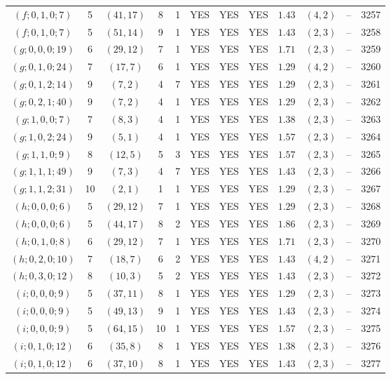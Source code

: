 \begin{longtable}{|c|c|c|c|c|c|c|c|c|c|c|c|}
$(f;0,1,0;7)$ & 5 & $(41,17)$ & 8 & 1 & YES & YES & YES & $1.43$ & $(4,2)$ & -- & 3257\\
$(f;0,1,0;7)$ & 5 & $(51,14)$ & 9 & 1 & YES & YES & YES & $1.43$ & $(2,3)$ & -- & 3258\\
$(g;0,0,0;19)$ & 6 & $(29,12)$ & 7 & 1 & YES & YES & YES & $1.71$ & $(2,3)$ & -- & 3259\\
$(g;0,1,0;24)$ & 7 & $(17,7)$ & 6 & 1 & YES & YES & YES & $1.29$ & $(4,2)$ & -- & 3260\\
$(g;0,1,2;14)$ & 9 & $(7,2)$ & 4 & 7 & YES & YES & YES & $1.29$ & $(2,3)$ & -- & 3261\\
$(g;0,2,1;40)$ & 9 & $(7,2)$ & 4 & 1 & YES & YES & YES & $1.29$ & $(2,3)$ & -- & 3262\\
$(g;1,0,0;7)$ & 7 & $(8,3)$ & 4 & 1 & YES & YES & YES & $1.38$ & $(2,3)$ & -- & 3263\\
$(g;1,0,2;24)$ & 9 & $(5,1)$ & 4 & 1 & YES & YES & YES & $1.57$ & $(2,3)$ & -- & 3264\\
$(g;1,1,0;9)$ & 8 & $(12,5)$ & 5 & 3 & YES & YES & YES & $1.57$ & $(2,3)$ & -- & 3265\\
$(g;1,1,1;49)$ & 9 & $(7,3)$ & 4 & 7 & YES & YES & YES & $1.43$ & $(2,3)$ & -- & 3266\\
$(g;1,1,2;31)$ & 10 & $(2,1)$ & 1 & 1 & YES & YES & YES & $1.29$ & $(2,3)$ & -- & 3267\\
$(h;0,0,0;6)$ & 5 & $(29,12)$ & 7 & 1 & YES & YES & YES & $1.29$ & $(2,3)$ & -- & 3268\\
$(h;0,0,0;6)$ & 5 & $(44,17)$ & 8 & 2 & YES & YES & YES & $1.86$ & $(2,3)$ & -- & 3269\\
$(h;0,1,0;8)$ & 6 & $(29,12)$ & 7 & 1 & YES & YES & YES & $1.71$ & $(2,3)$ & -- & 3270\\
$(h;0,2,0;10)$ & 7 & $(18,7)$ & 6 & 2 & YES & YES & YES & $1.43$ & $(4,2)$ & -- & 3271\\
$(h;0,3,0;12)$ & 8 & $(10,3)$ & 5 & 2 & YES & YES & YES & $1.43$ & $(2,3)$ & -- & 3272\\
$(i;0,0,0;9)$ & 5 & $(37,11)$ & 8 & 1 & YES & YES & YES & $1.29$ & $(2,3)$ & -- & 3273\\
$(i;0,0,0;9)$ & 5 & $(49,13)$ & 9 & 1 & YES & YES & YES & $1.43$ & $(2,3)$ & -- & 3274\\
$(i;0,0,0;9)$ & 5 & $(64,15)$ & 10 & 1 & YES & YES & YES & $1.57$ & $(2,3)$ & -- & 3275\\
$(i;0,1,0;12)$ & 6 & $(35,8)$ & 8 & 1 & YES & YES & YES & $1.38$ & $(2,3)$ & -- & 3276\\
$(i;0,1,0;12)$ & 6 & $(37,10)$ & 8 & 1 & YES & YES & YES & $1.43$ & $(2,3)$ & -- & 3277\\

\end{longtable}
